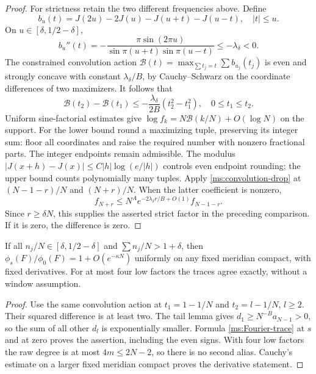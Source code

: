 \begin{proof}
For strictness retain the two different frequencies above. Define
\[
 b_u(t)=J(2u)-2J(u)-J(u+t)-J(u-t),\quad |t|\le u.
\]
On $u\in[\delta,1/2-\delta]$,
\[
 b_u''(t)=-\frac{\pi\sin(2\pi u)}
                 {\sin\pi(u+t)\sin\pi(u-t)}\le-\lambda_\delta<0.
\]
The constrained convolution action
$\mathcal B(t)=\max_{\sum t_j=t}\sum b_{u_j}(t_j)$
is even and strongly concave with constant $\lambda_\delta/B$,
by Cauchy--Schwarz on the coordinate differences of two maximizers.
It follows that
\begin{equation}\label{ms:convolution-drop}
 \mathcal B(t_2)-\mathcal B(t_1)
 \le-\frac{\lambda_\delta}{2B}(t_2^2-t_1^2),\quad 0\le t_1\le t_2.
\end{equation}
Uniform sine-factorial estimates give
$\log f_k=N\mathcal B(k/N)+O(\log N)$ on the support.
For the lower bound round a maximizing tuple, preserving its integer
sum: floor all coordinates and raise the required number with
nonzero fractional parts. The integer endpoints remain admissible.
The modulus $|J(x+h)-J(x)|\le C|h|\log(e/|h|)$ controls even
endpoint rounding; the upper bound counts polynomially many tuples.
Apply \eqref{ms:convolution-drop} at
$(N-1-r)/N$ and $(N+r)/N$. When the latter coefficient is nonzero,
\[
 f_{N+r}\le N^A e^{-2\lambda_\delta r/B+O(1)}f_{N-1-r}.
\]
Since $r\ge\delta N$, this supplies the asserted strict factor
in the preceding comparison. If it is zero, the difference is zero.
\end{proof}

\begin{corollary}\label{ms:regular-trace}
If all $n_j/N\in[\delta,1/2-\delta]$ and $\sum n_j/N>1+\delta$,
then $\phi_s(F)/\phi_0(F)=1+O(e^{-\kappa N})$ uniformly on any
fixed meridian compact, with fixed derivatives. For at most four
low factors the traces agree exactly, without a window assumption.
\end{corollary}
\begin{proof}
Use the same convolution action at $t_1=1-1/N$ and
$t_2=l-1/N$, $l\ge2$. Their squared difference is at least two.
The tail lemma gives $d_1\ge N^{-B}a_{N-1}>0$, so the sum of all
other $d_l$ is exponentially smaller. Formula
\eqref{ms:Fourier-trace} at $s$ and at zero proves the assertion,
including the even signs. With four low factors the raw degree is
at most $4m\le2N-2$, so there is no second alias. Cauchy's estimate
on a larger fixed meridian compact proves the derivative statement.
\end{proof}

